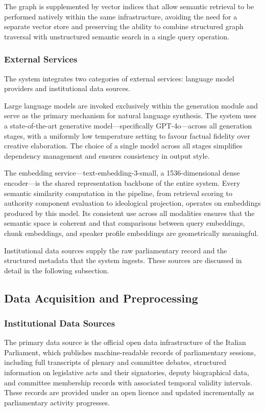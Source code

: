 The graph is supplemented by vector indices that allow semantic retrieval to be performed
natively within the same infrastructure, avoiding the need for a separate vector store and
preserving the ability to combine structured graph traversal with unstructured semantic
search in a single query operation.

\subsubsection{External Services}

The system integrates two categories of external services: language model providers and
institutional data sources.

Large language models are invoked exclusively within the generation module and serve as the
primary mechanism for natural language synthesis. The system uses a state-of-the-art
generative model---specifically GPT-4o---across all generation stages, with a uniformly
low temperature setting to favour factual fidelity over creative elaboration. The choice
of a single model across all stages simplifies dependency management and ensures
consistency in output style.

The embedding service---text-embedding-3-small, a 1536-dimensional dense encoder---is the
shared representation backbone of the entire system. Every semantic similarity computation
in the pipeline, from retrieval scoring to authority component evaluation to ideological
projection, operates on embeddings produced by this model. Its consistent use across all
modalities ensures that the semantic space is coherent and that comparisons between query
embeddings, chunk embeddings, and speaker profile embeddings are geometrically meaningful.

Institutional data sources supply the raw parliamentary record and the structured metadata
that the system ingests. These sources are discussed in detail in the following subsection.


\subsection{Data Acquisition and Preprocessing}
\label{sec:data-acquisition}

\subsubsection{Institutional Data Sources}

The primary data source is the official open data infrastructure of the Italian Parliament,
which publishes machine-readable records of parliamentary sessions, including full
transcripts of plenary and committee debates, structured information on legislative acts
and their signatories, deputy biographical data, and committee membership records with
associated temporal validity intervals. These records are provided under an open licence
and updated incrementally as parliamentary activity progresses.

